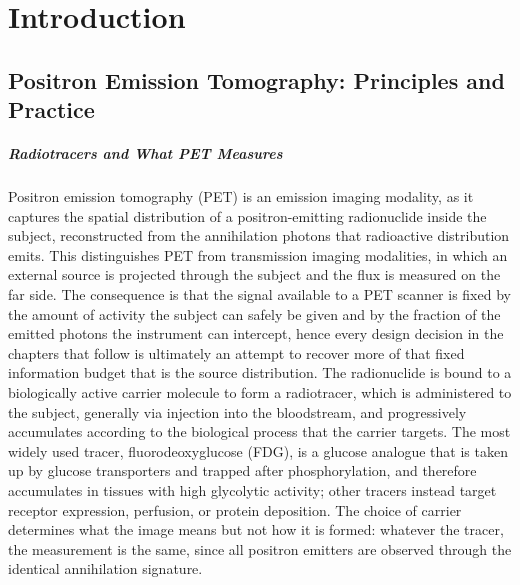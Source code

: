 \chapter{Introduction}
\label{ch:introduction}

\section{Positron Emission Tomography: Principles and Practice}
\label{sec:pet-principles}

\paragraph{Radiotracers and What PET Measures}
Positron emission tomography (PET) is an emission imaging modality, as it captures the spatial distribution of a positron-emitting radionuclide inside the subject, reconstructed from the annihilation photons that radioactive distribution emits.
This distinguishes PET from transmission imaging modalities, in which an external source is projected through the subject and the flux is measured on the far side.
The consequence is that the signal available to a PET scanner is fixed by the amount of activity the subject can safely be given and by the fraction of the emitted photons the instrument can intercept, hence every design decision in the chapters that follow is ultimately an attempt to recover more of that fixed information budget that is the source distribution.
The radionuclide is bound to a biologically active carrier molecule to form a radiotracer, which is administered to the subject, generally via injection into the bloodstream, and progressively accumulates according to the biological process that the carrier targets.
The most widely used tracer, fluorodeoxyglucose (FDG), is a glucose analogue that is taken up by glucose transporters and trapped after phosphorylation, and therefore accumulates in tissues with high glycolytic activity; other tracers instead target receptor expression, perfusion, or protein deposition.
The choice of carrier determines what the image means but not how it is formed: whatever the tracer, the measurement is the same, since all positron emitters are observed through the identical  annihilation signature.

